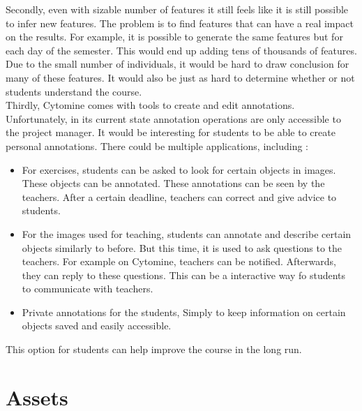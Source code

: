 \documentclass[a4paper,11pt]{report}
\numberwithin{figure}{chapter} %
\begin{document}
        Secondly, even with sizable number of features it still feels like it is still possible to infer new features.
        The problem is to find features that can have a real impact on the results.
        For example, it is possible to generate the same features but for each day of the semester.
        This would end up adding tens of thousands of features.
        Due to the small number of individuals, it would be hard to draw conclusion for many of these features.
        It would also be just as hard to determine whether or not students understand the course.\\

        Thirdly, Cytomine comes with tools to create and edit annotations.
        Unfortunately, in its current state annotation operations are only accessible to the project manager.
        It would be interesting for students to be able to create personal annotations.
        There could be multiple applications, including :
        \begin{itemize}
            \item[\textbullet] For exercises, students can be asked to look for certain objects in images.
            These objects can be annotated.
            These annotations can be seen by the teachers.
            After a certain deadline, teachers can correct and give advice to students.
            \item[\textbullet] For the images used for teaching, students can annotate and describe certain objects similarly to before.
            But this time, it is used to ask questions to the teachers.
            For example on Cytomine, teachers can be notified.
            Afterwards, they can reply to these questions.
            This can be a interactive way fo students to communicate with teachers.
            \item[\textbullet] Private annotations for the students, Simply to keep information on certain objects saved and easily accessible.
        \end{itemize}
        This option for students can help improve the course in the long run.

    \section{Assets}
\end{document}
